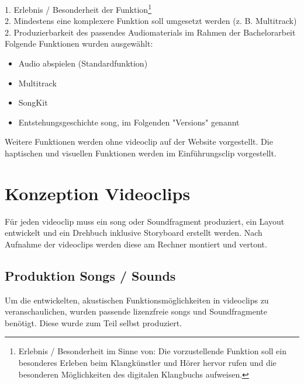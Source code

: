 1. Erlebnis / Besonderheit der Funktion\footnote{Erlebnis / Besonderheit im Sinne von: Die vorzustellende Funktion soll ein besonderes Erleben beim Klangkünstler und Hörer hervor rufen und die besonderen Möglichkeiten des digitalen Klangbuchs aufweisen.}\\ 
2. Mindestens eine komplexere Funktion soll umgesetzt werden (z. B. Multitrack)\\
2. Produzierbarkeit des passendes Audiomaterials im Rahmen der Bachelorarbeit\\

Folgende Funktionen wurden ausgewählt:

\begin{itemize}
\item Audio abspielen (Standardfunktion)
\item Multitrack 
\item SongKit
\item Entstehungsgeschichte \gls{song}, im Folgenden "Versions" genannt
\end{itemize}

Weitere Funktionen werden ohne \gls{videoclip} auf der Website vorgestellt. Die haptischen und visuellen Funktionen werden im Einführungsclip vorgestellt.




\section{Konzeption Videoclips}

Für jeden \gls{videoclip} muss ein \gls{song} oder Soundfragment produziert, ein Layout entwickelt und ein Drehbuch inklusive Storyboard erstellt werden. Nach Aufnahme der \gls{videoclip}s werden diese am Rechner montiert und vertont.

\subsection{Produktion Songs / Sounds}
Um die entwickelten, akustischen Funktionsmöglichkeiten in \gls{videoclip}s zu veranschaulichen, wurden passende lizenzfreie \gls{song}s und Soundfragmente benötigt. Diese wurde zum Teil selbst produziert.


